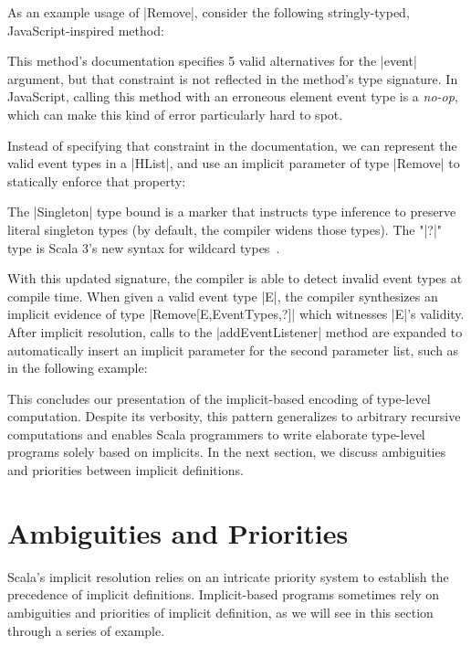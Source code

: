 As an example usage of |Remove|, consider the following stringly-typed, JavaScript-inspired method:

\addEventListenerJS

\noindent
This method's documentation specifies 5 valid alternatives for the |event| argument, but that constraint is not reflected in the method's type signature.
In JavaScript, calling this method with an erroneous element event type is a \emph{no-op}, which can make this kind of error particularly hard to spot.

Instead of specifying that constraint in the documentation, we can represent the valid event types in a |HList|, and use an implicit parameter of type |Remove| to statically enforce that property:

\addEventListenerImplicitDef

\noindent
The |Singleton| type bound is a marker that instructs type inference to preserve literal singleton types (by default, the compiler widens those types).
The "|?|" type is Scala 3's new syntax for wildcard types~\citep{dotty2014wildcard}.

With this updated signature, the compiler is able to detect invalid event types at compile time.
When given a valid event type |E|, the compiler synthesizes an implicit evidence of type |Remove[E,EventTypes,?]| which witnesses |E|'s validity.
After implicit resolution, calls to the |addEventListener| method are expanded to automatically insert an implicit parameter for the second parameter list, such as in the following example:

\addEventListenerImplicitCall

This concludes our presentation of the implicit-based encoding of type-level computation.
Despite its verbosity, this pattern generalizes to arbitrary recursive computations and enables Scala programmers to write elaborate type-level programs solely based on implicits.
In the next section, we discuss ambiguities and priorities between implicit definitions.

\section{Ambiguities and Priorities}

Scala's implicit resolution relies on an intricate priority system to establish the precedence of implicit definitions.
Implicit-based programs sometimes rely on ambiguities and priorities of implicit definition, as we will see in this section through a series of example.

